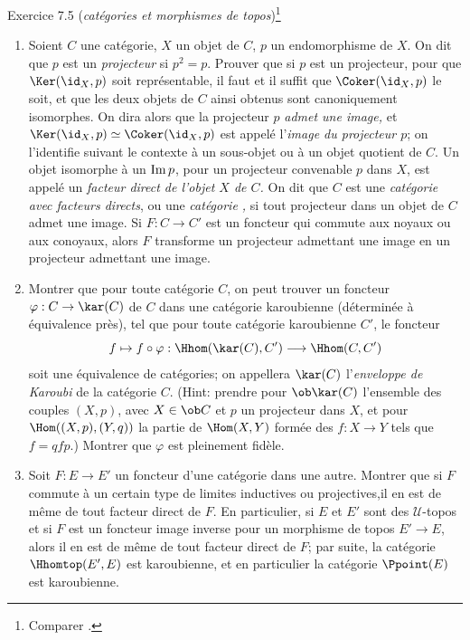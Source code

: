 \begin{enonce*}[remark]{Exercice 7.5}
(\emph{catégories\pageoriginale {} et morphismes de
topos})\footnote[1]{Comparer .}
\begin{enumerate}
\renewcommand{\theenumi}{\alph{enumi}}
\renewcommand{\labelenumi}{\theenumi)}
\item Soient $C$ une catégorie, $X$ un objet de $C$, $p$ un
endomorphisme de $X$. On dit que $p$ est un \emph{projecteur} si
$p^2=p$. Prouver que si $p$ est un projecteur, pour que
$\Ker(\id_X,p)$ soit représentable, il faut et il suffit que
$\Coker(\id_X,p)$ le soit, et que les deux objets de $C$ ainsi
obtenus sont canoniquement isomorphes. On dira alors que la
projecteur $p$ \emph{admet une image,} et $\Ker(\id_X,p)\simeq
\Coker(\id_X,p)$ est appelé l'\emph{image du projecteur $p$}; on
l'identifie suivant le contexte à un sous-objet ou à un objet
quotient de $C$. Un objet isomorphe à un $\text{Im\,} p$, pour un
projecteur convenable $p$ dans $X$, est appelé un \emph{facteur
direct de l'objet $X$ de $C$.} On dit que $C$ est une
\emph{catégorie avec facteurs directs}, ou une \emph{catégorie
,} si tout projecteur dans un objet de $C$ admet une
image. Si $F:C\rightarrow C'$ est un foncteur qui commute aux noyaux
ou aux conoyaux, alors $F$ transforme un projecteur admettant une
image en un projecteur admettant une image.

\item Montrer que pour toute catégorie $C$, on peut trouver un
foncteur $\varphi:C\rightarrow \kar (C)$ de $C$ dans une catégorie
karoubienne (déterminée à équivalence près), tel que pour toute
catégorie karoubienne $C'$, le foncteur
$$
f\mapsto f\circ \varphi:\Hhom(\kar(C),C')\longrightarrow \Hhom(C,C')
$$
soit une équivalence de catégories; on appellera $\kar(C)$
l'\emph{enveloppe de Karoubi} de la catégorie $C$. (Hint: prendre
pour $\ob \kar (C)$ l'ensemble des couples $(X,p)$, avec $X\in \ob
C$ et $p$ un projecteur dans $X$, et pour $\Hom((X,p),(Y,q))$ la
partie de $\Hom(X,Y)$ formée des $f:X\rightarrow Y$ tels que
$f=qfp.$) Montrer que $\varphi$ est pleinement fidèle.

\item Soit $F:E\rightarrow E'$ un foncteur d'une catégorie dans une
autre. Montrer que si $F$ commute à un certain type de limites
inductives ou projectives,\pageoriginale il en est de même de tout
facteur direct de $F$. En particulier, si $E$ et $E'$ sont des
$𝒰$-topos et si $F$ est un foncteur image inverse pour un
morphisme de topos $E'\rightarrow E$, alors il en est de même de
tout facteur direct de $F$; par suite, la catégorie $\Hhomtop(E',E)$
est karoubienne, et en particulier la catégorie $\Ppoint(E)$ est
karoubienne.


\end{enumerate}
\end{enonce*}
